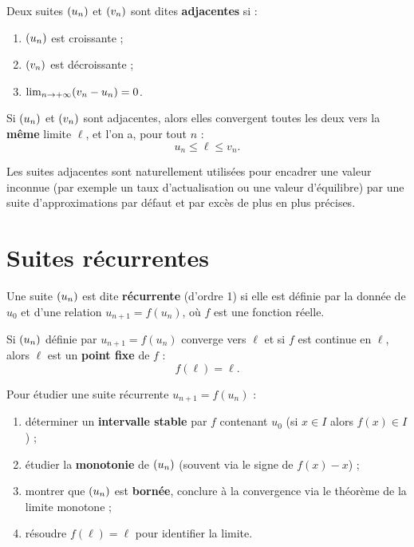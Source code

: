 \documentclass[12pt,a4paper]{article}
\begin{document}
\begin{definitionbox}
Deux suites $(u_n)$ et $(v_n)$ sont dites \textbf{adjacentes} si :
\begin{enumerate}
  \item $(u_n)$ est croissante ;
  \item $(v_n)$ est décroissante ;
  \item $\lim_{n\to +\infty} (v_n - u_n) = 0$.
\end{enumerate}
\end{definitionbox}

\begin{theoremebox}
Si $(u_n)$ et $(v_n)$ sont adjacentes, alors elles convergent toutes les deux vers la \textbf{même} limite $\ell$, et l'on a, pour tout $n$ :
\[
u_n \leq \ell \leq v_n.
\]
\end{theoremebox}

\begin{gestionbox}
Les suites adjacentes sont naturellement utilisées pour encadrer une valeur inconnue (par exemple un taux d'actualisation ou une valeur d'équilibre) par une suite d'approximations par défaut et par excès de plus en plus précises.
\end{gestionbox}

\section{Suites récurrentes}

\begin{definitionbox}[9.1]
Une suite $(u_n)$ est dite \textbf{récurrente} (d'ordre 1) si elle est définie par la donnée de $u_0$ et d'une relation $u_{n+1} = f(u_n)$, où $f$ est une fonction réelle.
\end{definitionbox}

\begin{propbox}
Si $(u_n)$ définie par $u_{n+1}=f(u_n)$ converge vers $\ell$ et si $f$ est continue en $\ell$, alors $\ell$ est un \textbf{point fixe} de $f$ :
\[
f(\ell)=\ell.
\]
\end{propbox}

\begin{methodebox}
Pour étudier une suite récurrente $u_{n+1}=f(u_n)$ :
\begin{enumerate}
  \item déterminer un \textbf{intervalle stable} par $f$ contenant $u_0$ (si $x\in I$ alors $f(x)\in I$) ;
  \item étudier la \textbf{monotonie} de $(u_n)$ (souvent via le signe de $f(x)-x$) ;
  \item montrer que $(u_n)$ est \textbf{bornée}, conclure à la convergence via le théorème de la limite monotone ;
  \item résoudre $f(\ell)=\ell$ pour identifier la limite.
\end{enumerate}
\end{methodebox}
\end{document}
